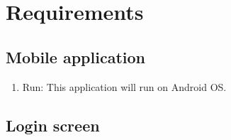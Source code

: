 \documentclass[conference]{IEEEtran}
\begin{document}
\section{Requirements}

\subsection{Mobile application}

\begin{enumerate}
\item Run: This application will run on Android OS. 

\end{enumerate}



\subsection{Login screen}   
\end{document}

